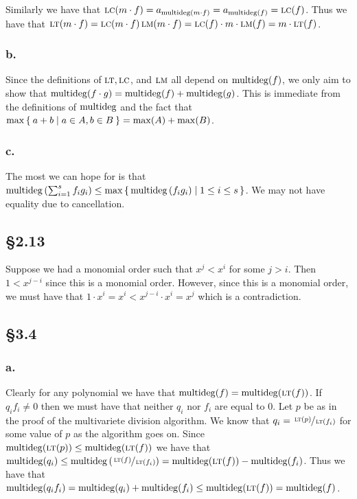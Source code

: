 \documentclass[letterpaper]{article}
\begin{document}
Similarly we have that $\operatorname{\textsc{lc}}(m \cdot f) = a_{\operatorname{multideg}(m \cdot f)} = a_{\operatorname{multideg}(f)} = \operatorname{\textsc{lc}}(f)$.
Thus we have that $\operatorname{\textsc{lt}}(m \cdot f) = \operatorname{\textsc{lc}}(m \cdot f) \operatorname{\textsc{lm}}(m \cdot f) = \operatorname{\textsc{lc}}(f) \cdot m \cdot \operatorname{\textsc{lm}}(f) = m \cdot \operatorname{\textsc{lt}}(f)$.

\subsubsection*{b.}

Since the definitions of $\operatorname{\textsc{lt}}, \operatorname{\textsc{lc}}$, and $\operatorname{\textsc{lm}}$ all depend on $\operatorname{multideg}(f)$, we only aim to show that $\operatorname{multideg}(f \cdot g) = \operatorname{multideg}(f) + \operatorname{multideg}(g)$.
This is immediate from the definitions of $\operatorname{multideg}$ and the fact that $\max\Set{a + b | a \in A, b \in B} = \max(A) + \max(B)$.

\subsubsection*{c.}

The most we can hope for is that $\mdeg\pqty{\sum_{i = 1}^{s} f_{i} g_{i}} \leq \max\set{\mdeg\pqty{f_{i} g_{i}} | 1 \leq i \leq s}$.
We may not have equality due to cancellation.

\subsection*{\S 2.13}

Suppose we had a monomial order such that $x^{j} < x^{i}$ for some $j > i$.
Then $1 < x^{j - i}$ since this is a monomial order.
However, since this is a monomial order, we must have that $1 \cdot x^{i} = x^{i} < x^{j - i} \cdot x^{i} = x^{j}$ which is a contradiction.

\clearpage

\subsection*{\S 3.4}

\subsubsection*{a.}

Clearly for any polynomial we have that $\operatorname{multideg}(f) = \operatorname{multideg}(\operatorname{\textsc{lt}}(f))$.
If $q_{i} f_{i} \neq 0$ then we must have that neither $q_{i}$ nor $f_{i}$ are equal to $0$.
Let $p$ be as in the proof of the multivariete division algorithm.
We know that $q_{i} = \sfrac{\operatorname{\textsc{lt}}(p)}{\operatorname{\textsc{lt}}(f_{i})}$ for some value of $p$ as the algorithm goes on.
Since $\operatorname{multideg}(\operatorname{\textsc{lt}}(p)) \leq \operatorname{multideg}(\operatorname{\textsc{lt}}(f))$ we have that $\mdeg(q_{i}) \leq \mdeg\pqty{\sfrac{\lt(f)}{\lt(f_{i})}} = \mdeg(\lt(f)) - \mdeg(f_{i})$.
Thus we have that $\operatorname{multideg}(q_{i}f_{i}) = \operatorname{multideg}(q_{i}) + \operatorname{multideg}(f_{i}) \leq \operatorname{multideg}(\operatorname{\textsc{lt}}(f)) = \operatorname{multideg}(f)$.
\end{document}
